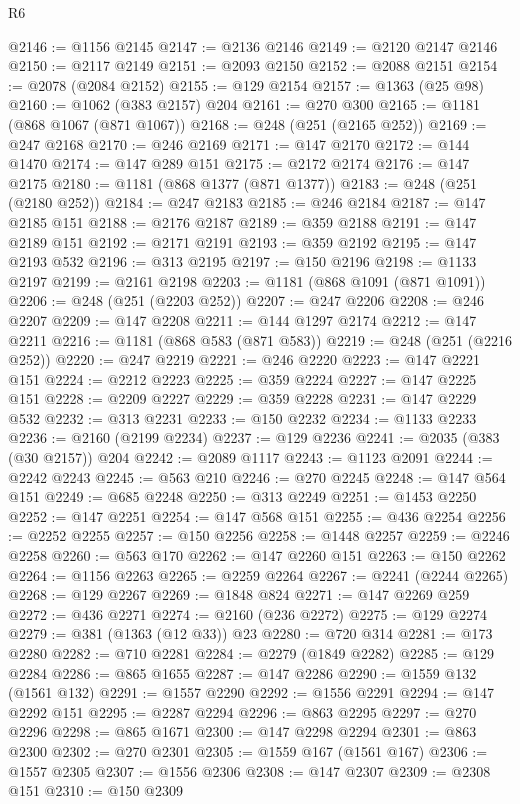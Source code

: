 \begin{lexlean}{R6}
\begin{coremodule}
@2146 := @1156 @2145
@2147 := @2136 @2146
@2149 := @2120 @2147 @2146
@2150 := @2117 @2149
@2151 := @2093 @2150
@2152 := @2088 @2151
@2154 := @2078 (@2084 @2152)
@2155 := @129 @2154
@2157 := @1363 (@25 @98)
@2160 := @1062 (@383 @2157) @204
@2161 := @270 @300
@2165 := @1181 (@868 @1067 (@871 @1067))
@2168 := @248 (@251 (@2165 @252))
@2169 := @247 @2168
@2170 := @246 @2169
@2171 := @147 @2170
@2172 := @144 @1470
@2174 := @147 @289 @151
@2175 := @2172 @2174
@2176 := @147 @2175
@2180 := @1181 (@868 @1377 (@871 @1377))
@2183 := @248 (@251 (@2180 @252))
@2184 := @247 @2183
@2185 := @246 @2184
@2187 := @147 @2185 @151
@2188 := @2176 @2187
@2189 := @359 @2188
@2191 := @147 @2189 @151
@2192 := @2171 @2191
@2193 := @359 @2192
@2195 := @147 @2193 @532
@2196 := @313 @2195
@2197 := @150 @2196
@2198 := @1133 @2197
@2199 := @2161 @2198
@2203 := @1181 (@868 @1091 (@871 @1091))
@2206 := @248 (@251 (@2203 @252))
@2207 := @247 @2206
@2208 := @246 @2207
@2209 := @147 @2208
@2211 := @144 @1297 @2174
@2212 := @147 @2211
@2216 := @1181 (@868 @583 (@871 @583))
@2219 := @248 (@251 (@2216 @252))
@2220 := @247 @2219
@2221 := @246 @2220
@2223 := @147 @2221 @151
@2224 := @2212 @2223
@2225 := @359 @2224
@2227 := @147 @2225 @151
@2228 := @2209 @2227
@2229 := @359 @2228
@2231 := @147 @2229 @532
@2232 := @313 @2231
@2233 := @150 @2232
@2234 := @1133 @2233
@2236 := @2160 (@2199 @2234)
@2237 := @129 @2236
@2241 := @2035 (@383 (@30 @2157)) @204
@2242 := @2089 @1117
@2243 := @1123 @2091
@2244 := @2242 @2243
@2245 := @563 @210
@2246 := @270 @2245
@2248 := @147 @564 @151
@2249 := @685 @2248
@2250 := @313 @2249
@2251 := @1453 @2250
@2252 := @147 @2251
@2254 := @147 @568 @151
@2255 := @436 @2254
@2256 := @2252 @2255
@2257 := @150 @2256
@2258 := @1448 @2257
@2259 := @2246 @2258
@2260 := @563 @170
@2262 := @147 @2260 @151
@2263 := @150 @2262
@2264 := @1156 @2263
@2265 := @2259 @2264
@2267 := @2241 (@2244 @2265)
@2268 := @129 @2267
@2269 := @1848 @824
@2271 := @147 @2269 @259
@2272 := @436 @2271
@2274 := @2160 (@236 @2272)
@2275 := @129 @2274
@2279 := @381 (@1363 (@12 @33)) @23
@2280 := @720 @314
@2281 := @173 @2280
@2282 := @710 @2281
@2284 := @2279 (@1849 @2282)
@2285 := @129 @2284
@2286 := @865 @1655
@2287 := @147 @2286
@2290 := @1559 @132 (@1561 @132)
@2291 := @1557 @2290
@2292 := @1556 @2291
@2294 := @147 @2292 @151
@2295 := @2287 @2294
@2296 := @863 @2295
@2297 := @270 @2296
@2298 := @865 @1671
@2300 := @147 @2298 @2294
@2301 := @863 @2300
@2302 := @270 @2301
@2305 := @1559 @167 (@1561 @167)
@2306 := @1557 @2305
@2307 := @1556 @2306
@2308 := @147 @2307
@2309 := @2308 @151
@2310 := @150 @2309

\end{coremodule}
\end{lexlean}
